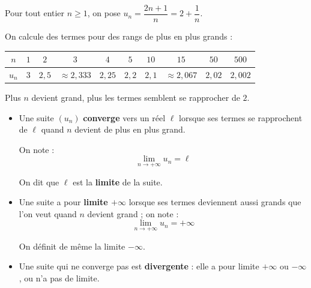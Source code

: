 \begin{ex}
	Pour tout entier $n \geq 1$, on pose $u_n = \dfrac{2n + 1}{n} = 2 + \dfrac{1}{n}$.

	On calcule des termes pour des rangs de plus en plus grands :
	\begin{center}
		\begin{tabular}{|c|c|c|c|c|c|c|c|c|c|} \hline
			\ccg $n$   & $1$ & $2$     & $3$               & $4$      & $5$     & $10$    & $15$              & $50$     & $500$     \\ \hline
			\ccg $u_n$ & $3$ & $2{,}5$ & $\approx 2{,}333$ & $2{,}25$ & $2{,}2$ & $2{,}1$ & $\approx 2{,}067$ & $2{,}02$ & $2{,}002$ \\ \hline
		\end{tabular}
	\end{center}

	Plus $n$ devient grand, plus les termes semblent se rapprocher de $2$.
\end{ex}

\begin{defin}
	\nline
	\begin{itemize}
		\item Une suite $(u_n)$ \textbf{converge} vers un réel $\ell$ lorsque ses termes se rapprochent de $\ell$ quand $n$ devient de plus en plus grand.

		      On note :
		      \[
			      \displaystyle\lim_{n \to +\infty} u_n = \ell
		      \]

		      On dit que $\ell$ est la \textbf{limite} de la suite.
		\item Une suite a pour \textbf{limite $+\infty$} lorsque ses termes deviennent aussi grands que l'on veut quand $n$ devient grand ; on note :
		      \[
			      \displaystyle\lim_{n \to +\infty} u_n = +\infty
		      \]

		      On définit de même la limite $-\infty$.
		\item Une suite qui ne converge pas est \textbf{divergente} : elle a pour limite $+\infty$ ou $-\infty$, ou n'a pas de limite.
	\end{itemize}
\end{defin}

